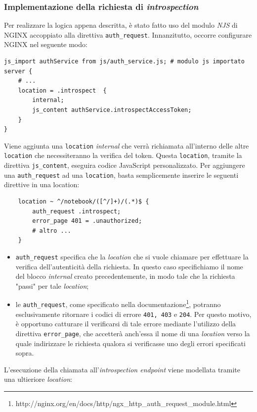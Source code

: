\subsubsection{Implementazione della richiesta di \textit{introspection}}
Per realizzare la logica appena descritta, è stato fatto uso del modulo \textit{NJS} di NGINX accoppiato alla direttiva \verb|auth_request|.
\newline
Innanzitutto, occorre configurare NGINX nel seguente modo:
\begin{verbatim}
js_import authService from js/auth_service.js; # modulo js importato
server {
    # ...
    location = .introspect  {
        internal;
        js_content authService.introspectAccessToken;
    }
}
\end{verbatim}
Viene aggiunta una \verb|location| \textit{internal} che verrà richiamata all'interno delle altre \verb|location| che necessiteranno la verifica del token.
\newline
Questa \verb|location|, tramite la direttiva \verb|js_content|, eseguira codice JavaScript personalizzato.
\newline
Per aggiungere una \verb|auth_request| ad una \verb|location|, basta semplicemente inserire le seguenti direttive in una location:
\begin{verbatim}
    location ~ ^/notebook/([^/]+)/(.*)$ { 
        auth_request .introspect;
        error_page 401 = .unauthorized;
        # altro ...
    }
\end{verbatim}
\begin{itemize}
    \item \verb|auth_request| specifica che la \textit{location} che si vuole chiamare per effettuare la verifica dell'autenticità della richiesta. In questo caso specifichiamo il nome del blocco \textit{internal} creato precedentemente, in modo tale che la richiesta "passi" per tale \textit{location};
    \item le \verb|auth_request|, come specificato nella documentazione\footnote{http://nginx.org/en/docs/http/ngx\_http\_auth\_request\_module.html}, potranno esclusivamente ritornare i codici di errore \verb|401, 403| e \verb|204|. Per questo motivo, è opportuno catturare il verificarsi di tale errore mediante l'utilizzo della direttiva \verb|error_page|, che accetterà anch'essa il nome di una \textit{location} verso la quale indirizzare le richiesta qualora si verificasse uno degli errori specificati sopra.
\end{itemize}
L'esecuzione della chiamata all'\textit{introspection endpoint} viene modellata tramite una ultieriore \textit{location}:
